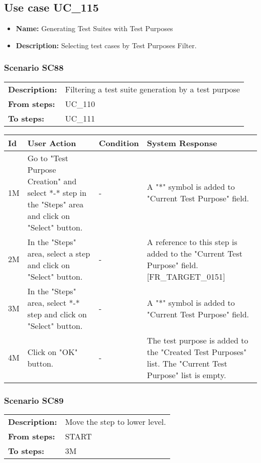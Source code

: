 \documentclass[a4paper,11pt]{article}
\newcommand{\bl}{\\ \hline}
\begin{document}
\subsection*{Use case UC_115}
\begin{itemize}
\item {\bf Name: }Generating Test Suites with Test Purposes
\item {\bf Description: }Selecting test cases by Test Purposes Filter.
			
\end{itemize}
\subsubsection*{Scenario SC88}
\begin{tabular}{p{1in}p{4in}}
{\bf Description:} & Filtering a test suite generation by a test purpose
				 \\
{\bf From steps:} & UC_110#2M \\
{\bf To steps:} & UC_111#2M \\
\end{tabular}
 
\begin{tabular}{|p{0.8in}|p{1.6in}|p{1.6in}|p{1.6in}|}
\hline
Id & User Action & Condition & System Response  \bl 
1M & Go to "Test Purpose Creation" and select *-* step in the
						"Steps" area and click on "Select" button.    & - & A "*" symbol is added to "Current Test Purpose" field.
					 \bl 
2M & In the "Steps" area, select a step and click on "Select"
						button. & - & A reference to this step is added to the "Current Test
						Purpose" field. [FR_TARGET_0151] \bl 
3M & In the "Steps" area, select *-* step and click on "Select"
						button.    & - & A "*" symbol is added to "Current Test Purpose" field.
					 \bl 
4M & Click on "OK" button. & - & The test purpose is added to the "Created Test Purposes"
						list. The "Current Test Purpose" list is empty. \bl 
\end{tabular}
\subsubsection*{Scenario SC89}
\begin{tabular}{p{1in}p{4in}}
{\bf Description:} & Move the step to lower level. \\
{\bf From steps:} & START \\
{\bf To steps:} & 3M \\
\end{tabular}
 
\end{document}
